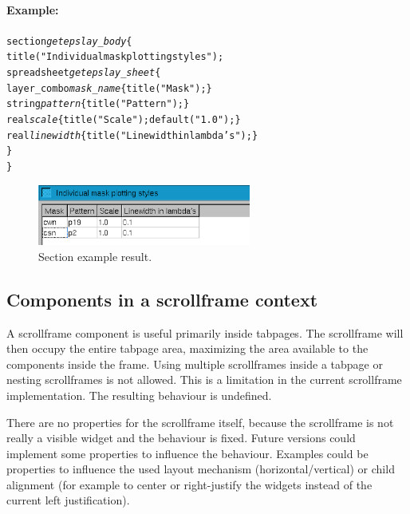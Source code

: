 \paragraph{Example:}
\begin{alltt}
section \emph{getepslay_body} \{
    title("Individual mask plotting styles");
    spreadsheet \emph{getepslay_sheet} \{
        layer_combo \emph{mask_name} \{ title("Mask"); \}
        string      \emph{pattern} \{ title("Pattern"); \}
        real        \emph{scale} \{ title("Scale"); default("1.0"); \}
        real        \emph{linewidth} \{ title("Linewidth in lambda's"); \}
    \}
\}
\end{alltt}

\begin{figure}[h!] \begin{center}
\includegraphics[width=7cm]{./figures/ex_section.eps}
\caption{Section example result.}
\end{center} \end{figure}


\subsection{Components in a scrollframe context}
A scrollframe component is useful primarily inside tabpages. The scrollframe
will then occupy the entire tabpage area, maximizing the area available to the
components inside the frame. Using multiple scrollframes inside a tabpage or
nesting scrollframes is not allowed. This is a limitation in the current
scrollframe implementation. The resulting behaviour is undefined.

There are no properties for the scrollframe itself, because the scrollframe is
not really a visible widget and the behaviour is fixed. Future versions could
implement some properties to influence the behaviour. Examples could be
properties to influence the used layout mechanism (horizontal/vertical) or
child alignment (for example to center or right-justify the widgets instead of
the current left justification).

